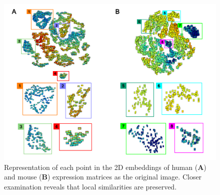 \documentclass[12pt,oneside,onecolumn,a4paper]{article}
\begin{document}
\begin{figure}[H]
\begin{center}
\includegraphics[width=\columnwidth]{figures/image_cluster}
\caption{Representation of each point in the 2D embeddings of human (\textbf{A}) and mouse (\textbf{B}) expression matrices as the original image. Closer examination reveals that local similarities are preserved. \label{fig:image_scatter}%
}
\end{center}
\end{figure}
\end{document}

